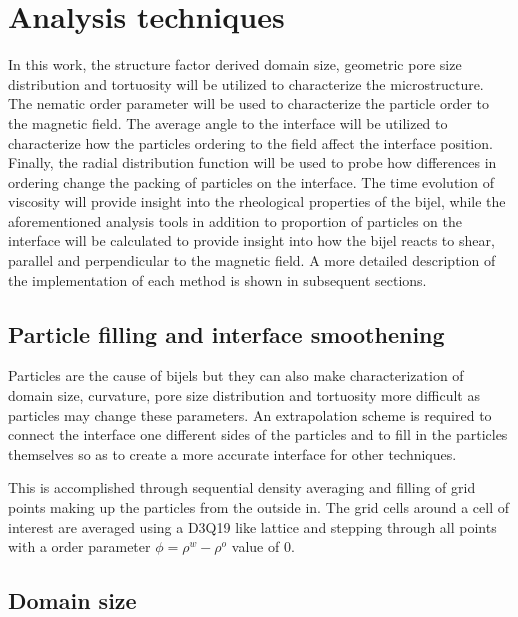 \section{Analysis techniques}

In this work, the structure factor derived domain size, geometric pore size distribution and tortuosity will be utilized to characterize the microstructure. The nematic order parameter will be used to characterize the particle order to the magnetic field. The average angle to the interface will be utilized to characterize how the particles ordering to the field affect the interface position. Finally, the radial distribution function will be used to probe how differences in ordering change the packing of particles on the interface. The time evolution of viscosity will provide insight into the rheological properties of the bijel, while the aforementioned analysis tools in addition to proportion of particles on the interface will be calculated to provide insight into how the bijel reacts to shear, parallel and perpendicular to the magnetic field. A more detailed description of the implementation of each method is shown in subsequent sections.

\subsection{Particle filling and interface smoothening}
\label{section:filling_routine}

Particles are the cause of bijels but they can also make characterization of domain size, curvature, pore size distribution and tortuosity more difficult as particles may change these parameters. An extrapolation scheme is required to connect the interface one different sides of the particles and to fill in the particles themselves so as to create a more accurate interface for other techniques.

This is accomplished through sequential density averaging and filling of grid points making up the particles from the outside in. The grid cells around a cell of interest are averaged using a D3Q19 like lattice and stepping through all points with a order parameter $\phi = \rho^w - \rho^o$ value of 0. 

\subsection{Domain size}

